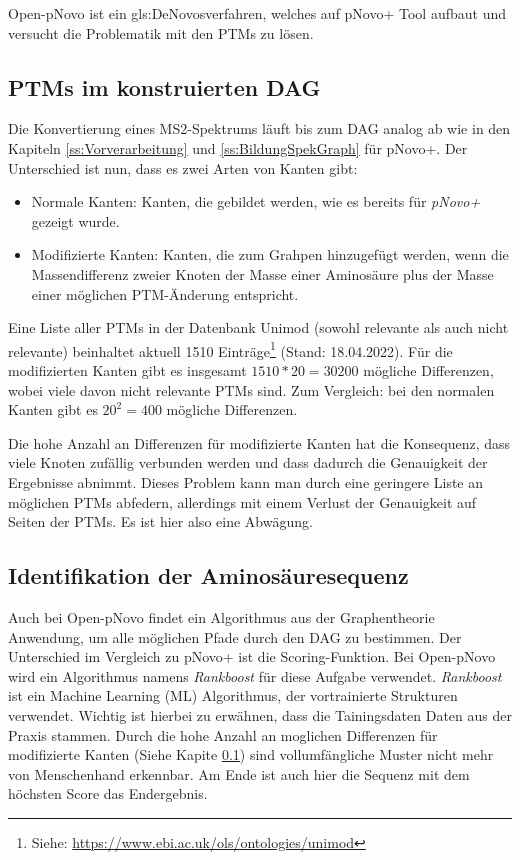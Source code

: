 \documentclass[a4paper, 12pt]{article}
\newcommand{\gerquot}[1]{\glqq#1\grqq}
\begin{document}
Open-pNovo ist ein \gls{gls:DeNovo}sverfahren, welches auf pNovo+ Tool aufbaut und versucht die Problematik mit den PTMs zu lösen.

\subsection{PTMs im konstruierten DAG}\label{ss:PTMUndDAG}
Die Konvertierung eines MS2-Spektrums läuft bis zum DAG analog ab wie in den Kapiteln \ref{ss:Vorverarbeitung} und \ref{ss:BildungSpekGraph} für pNovo+. Der Unterschied ist nun, dass es zwei Arten von Kanten gibt:

\begin{itemize}
   \item \gerquot{Normale} Kanten: Kanten, die gebildet werden, wie es bereits für \emph{pNovo+} gezeigt wurde. 
   \item \gerquot{Modifizierte} Kanten: Kanten, die zum Grahpen hinzugefügt werden, wenn die Massendifferenz zweier Knoten der Masse einer Aminosäure plus der Masse einer möglichen PTM-Änderung entspricht. 
\end{itemize}

Eine Liste aller PTMs in der Datenbank Unimod (sowohl relevante als auch nicht relevante) beinhaltet aktuell 1510 Einträge\footnote{Siehe: \url{https://www.ebi.ac.uk/ols/ontologies/unimod}} (Stand: 18.04.2022). Für die modifizierten Kanten gibt es insgesamt $ 1510 * 20 = 30200 $ mögliche Differenzen, wobei viele davon nicht relevante PTMs sind. Zum Vergleich: bei den normalen Kanten gibt es $ 20^2 = 400 $ mögliche Differenzen.

Die hohe Anzahl an Differenzen für modifizierte Kanten hat die Konsequenz, dass viele Knoten zufällig verbunden werden und dass dadurch die Genauigkeit der Ergebnisse abnimmt. Dieses Problem kann man durch eine geringere Liste an möglichen PTMs abfedern, allerdings mit einem Verlust  der Genauigkeit auf Seiten der PTMs. Es ist hier also eine Abwägung.

\subsection{Identifikation der Aminosäuresequenz}
Auch bei Open-pNovo findet ein Algorithmus aus der Graphentheorie Anwendung, um alle möglichen Pfade durch den DAG zu bestimmen. Der Unterschied im Vergleich zu pNovo+ ist die Scoring-Funktion. Bei Open-pNovo wird ein Algorithmus namens \emph{Rankboost} für diese Aufgabe verwendet. \emph{Rankboost} ist ein Machine Learning (ML) Algorithmus, der vortrainierte Strukturen verwendet. Wichtig ist hierbei zu erwähnen, dass die Tainingsdaten Daten aus der Praxis stammen. Durch die hohe Anzahl an moglichen Differenzen für modifizierte Kanten (Siehe Kapite \ref{ss:PTMUndDAG}) sind vollumfängliche Muster nicht mehr von Menschenhand erkennbar. Am Ende ist auch hier die Sequenz mit dem höchsten Score das Endergebnis.
\end{document}
